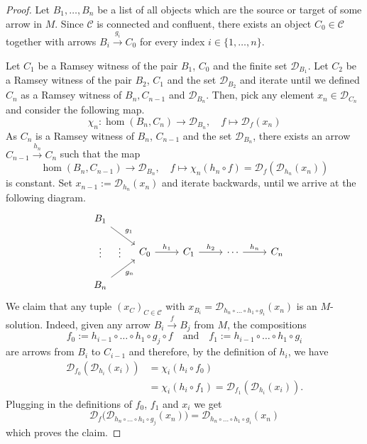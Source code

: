 \documentclass[preprint,12pt]{elsarticle}
\newcommand{\cat}[1]{\mathcal{#1}}
\begin{document}
\begin{proof}
Let $B_1,\dots,B_n$ be a list of all objects which are the source or target of some arrow in $M$. Since $\cat C$ is connected and confluent, there exists an object $C_0\in \cat C$ together with arrows $B_i\xrightarrow{g_i} C_0$ for every index $i\in\{1,\dots,n\}$.

Let $C_1$  be a Ramsey witness of the pair $B_1$, $C_0$ and the finite set $\cat D_{B_1}$. 
    Let $C_2$ be a Ramsey witness of the pair $B_2$, $C_1$ and the set $\cat D_{B_2}$ and iterate until we defined $C_n$ as a Ramsey witness of $B_n, C_{n-1}$ and $\cat D_{B_n}$. Then, pick any element $x_n\in \cat D_{C_n}$ and consider the following map. 
    $$
    \chi_n : \hom(B_n,C_n)\to \cat D_{B_n},\quad f\mapsto\cat D_f(x_n)
    $$
    As $C_n$ is a Ramsey witness of $B_n$, $ C_{n-1}$ and the set $\cat D_{B_n}$, there exists an arrow $C_{n-1}\xrightarrow{h_n} C_n$ such that the map
    $$
    \hom(B_n, C_{n-1})\to \cat D_{B_n},\quad f\mapsto 
    \chi_n(h_n \circ f) =
    \cat D_f ( \cat D_{h_n}(x_n) ) 
    $$
    is constant.
    Set $x_{n-1}:= \cat D_{h_n}(x_n)$ and iterate backwards, until we arrive at the following diagram.
    $$
    \begin{tikzcd}
    &B_1 \arrow[rd, "g_1"]              &                      &                      &    &                    &     \\
    \arrow[rr, "\vdots", phantom, shift left=1]& \arrow[r, "\vdots", phantom, shift left=1] & C_0 \arrow[r, "h_1"] & C_1 \arrow[r, "h_2"] & \cdots \arrow[r, "h_n"] & C_n &\\
    &B_n \arrow[ru, "g_n"']             &                      &                      &                        &    &
    \end{tikzcd}
    $$
    We claim that any tuple $(x_C)_{C\in\cat C}$ with $x_{B_i}=\cat D_{h_n\circ\dots\circ h_1\circ g_i}(x_n)$ is an $M$-solution. %
    Indeed, given any arrow $B_i\xrightarrow{f} B_j$ from $M$, the compositions 
    $$
    f_0:= h_{i-1}\circ\dots \circ h_1\circ g_j \circ f \quad\text{and}\quad f_1:= h_{i-1}\circ\dots\circ h_1\circ g_i
    $$
    are arrows from $B_i$ to $C_{i-1}$ and therefore, by the definition of $h_i$, we have
    \begin{align*}
    \cat D_{f_0}(\cat D_{h_i}(x_i))&= 
    \chi_i(h_i\circ f_0) \\&= 
    \chi_i(h_i\circ f_1)=
    \cat D_{f_1}(\cat D_{h_i}(x_i)).
    \end{align*}
    Plugging in the definitions of $f_0$, $f_1$ and $x_i$ we get
$$
        \cat D_f\big( \cat D_{h_n\circ\dots\circ h_1\circ g_j}( x_n ) \big) 
        =
        \cat D_{h_n\circ\dots\circ h_1\circ g_i}( x_n ) 
$$
    which proves the claim.
\end{proof}
\end{document}
